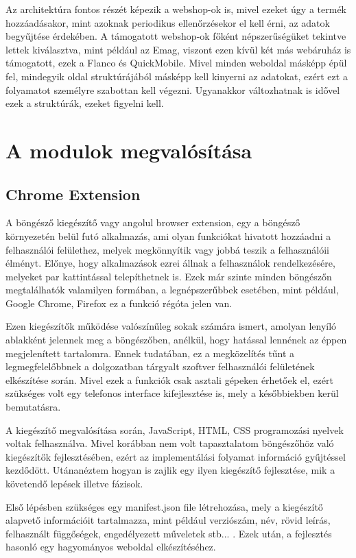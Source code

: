 Az architektúra fontos részét képezik a webshop-ok is, mivel ezeket úgy a termék hozzáadásakor, mint azoknak periodikus ellenőrzésekor el kell érni, az adatok begyűjtése érdekében. A támogatott webshop-ok főként népszerűségüket tekintve lettek kiválasztva, mint például az Emag, viszont ezen kívül két más webáruház is támogatott, ezek a Flanco és QuickMobile. Mivel minden weboldal másképp épül fel, mindegyik oldal struktúrájából másképp kell kinyerni az adatokat, ezért ezt a folyamatot személyre szabottan kell végezni. Ugyanakkor változhatnak is idővel ezek a struktúrák, ezeket figyelni kell. 

\section{A modulok megvalósítása}

\subsection{Chrome Extension}

A böngésző kiegészítő vagy angolul browser extension, egy a böngésző környezetén belül futó alkalmazás, ami olyan funkciókat hivatott hozzáadni a felhasználói felülethez, melyek megkönnyítik vagy jobbá teszik a felhasználóii élményt. Előnye, hogy alkalmazások ezrei állnak a felhasználok rendelkezésére, melyeket par kattintással telepíthetnek is. Ezek már szinte minden böngészőn megtalálhatók valamilyen formában, a legnépszerűbbek esetében, mint például, Google Chrome, Firefox ez a funkció régóta jelen van.

Ezen kiegészítők működése valószínűleg sokak számára ismert, amolyan lenyíló ablakként jelennek meg a böngészőben, anélkül, hogy hatással lennének az éppen megjelenített tartalomra. Ennek tudatában, ez a megközelítés tűnt a legmegfelelőbbnek a dolgozatban tárgyalt szoftver felhasználói felületének elkészítése során. Mivel ezek a funkciók csak asztali gépeken érhetőek el, ezért szükséges volt egy telefonos interface kifejlesztése is, mely a későbbiekben kerül bemutatásra.

A kiegészítő megvalósítása során, JavaScript, HTML, CSS programozási nyelvek voltak felhasználva. Mivel korábban nem volt tapasztalatom böngészőhöz való kiegészítők fejlesztésében, ezért az implementálási folyamat információ gyűjtéssel kezdődött. Utánanéztem hogyan is zajlik egy ilyen kiegészítő fejlesztése, mik a követendő lepések illetve fázisok.

Első lépésben szükséges egy manifest.json file létrehozása, mely a kiegészítő alapvető információit tartalmazza, mint például verziószám, név, rövid leírás, felhasznált függőségek, engedélyezett műveletek stb... . Ezek után, a fejlesztés hasonló egy hagyományos weboldal elkészítéséhez. 

